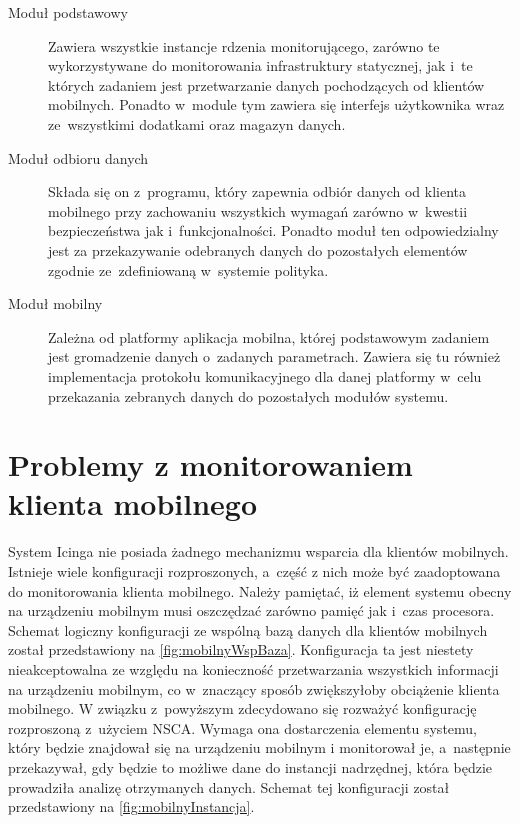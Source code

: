 \begin{description}
\item[Moduł podstawowy] Zawiera wszystkie instancje rdzenia
  monitorującego, zarówno te wykorzystywane do monitorowania
  infrastruktury statycznej, jak i~te których zadaniem jest
  przetwarzanie danych pochodzących od klientów mobilnych. Ponadto
  w~module tym zawiera się interfejs użytkownika wraz ze~wszystkimi
  dodatkami oraz magazyn danych.

\item[Moduł odbioru danych] Składa się on z~programu, który zapewnia
  odbiór danych od klienta mobilnego przy zachowaniu wszystkich
  wymagań zarówno w~kwestii bezpieczeństwa jak
  i~funkcjonalności. Ponadto moduł ten odpowiedzialny jest za
  przekazywanie odebranych danych do pozostałych elementów zgodnie
  ze~zdefiniowaną w~systemie polityka.

\item[Moduł mobilny] Zależna od platformy aplikacja mobilna, której
  podstawowym zadaniem jest gromadzenie danych o~zadanych
  parametrach. Zawiera się tu również implementacja protokołu
  komunikacyjnego dla danej platformy w~celu przekazania zebranych
  danych do pozostałych modułów systemu.
\end{description}

\section[Problemy][Problemy z monitorowaniem klienta mobilnego]{Problemy z monitorowaniem klienta mobilnego}

System Icinga nie posiada żadnego mechanizmu wsparcia dla klientów
mobilnych. Istnieje wiele konfiguracji rozproszonych, a~część z nich
może być zaadoptowana do monitorowania klienta mobilnego. Należy
pamiętać, iż element systemu obecny na urządzeniu mobilnym musi
oszczędzać zarówno pamięć jak i~czas procesora. Schemat logiczny
konfiguracji ze wspólną bazą danych dla klientów mobilnych został
przedstawiony na \ref{fig:mobilnyWspBaza}. Konfiguracja ta jest
niestety nieakceptowalna ze względu na konieczność przetwarzania
wszystkich informacji na urządzeniu mobilnym, co w~znaczący sposób
zwiększyłoby obciążenie klienta mobilnego.  W związku z~powyższym
zdecydowano się rozważyć konfigurację rozproszoną z~użyciem
NSCA. Wymaga ona dostarczenia elementu systemu, który będzie znajdował
się na urządzeniu mobilnym i monitorował je, a~następnie przekazywał,
gdy będzie to możliwe dane do instancji nadrzędnej, która będzie
prowadziła analizę otrzymanych danych. Schemat tej konfiguracji został
przedstawiony na \ref{fig:mobilnyInstancja}.

